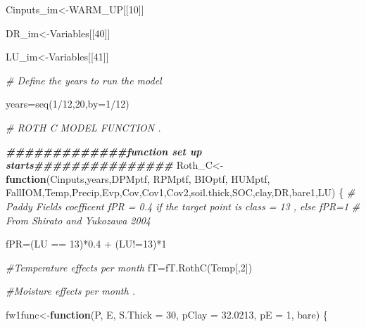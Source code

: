 \documentclass[
  10pt,
  b5paper,
]{book}
\newenvironment{Shaded}{\begin{snugshade}}{\end{snugshade}}
\newcommand{\AttributeTok}[1]{\textcolor[rgb]{0.77,0.63,0.00}{#1}}
\newcommand{\CommentTok}[1]{\textcolor[rgb]{0.56,0.35,0.01}{\textit{#1}}}
\newcommand{\ControlFlowTok}[1]{\textcolor[rgb]{0.13,0.29,0.53}{\textbf{#1}}}
\newcommand{\DecValTok}[1]{\textcolor[rgb]{0.00,0.00,0.81}{#1}}
\newcommand{\DocumentationTok}[1]{\textcolor[rgb]{0.56,0.35,0.01}{\textbf{\textit{#1}}}}
\newcommand{\FloatTok}[1]{\textcolor[rgb]{0.00,0.00,0.81}{#1}}
\newcommand{\FunctionTok}[1]{\textcolor[rgb]{0.00,0.00,0.00}{#1}}
\newcommand{\NormalTok}[1]{#1}
\newcommand{\OtherTok}[1]{\textcolor[rgb]{0.56,0.35,0.01}{#1}}
\newcommand{\SpecialCharTok}[1]{\textcolor[rgb]{0.00,0.00,0.00}{#1}}
\begin{document}
\begin{Shaded}
\begin{Highlighting}[]
\NormalTok{Cinputs\_im}\OtherTok{\textless{}{-}}\NormalTok{WARM\_UP[[}\DecValTok{10}\NormalTok{]]}

\NormalTok{DR\_im}\OtherTok{\textless{}{-}}\NormalTok{Variables[[}\DecValTok{40}\NormalTok{]]}

\NormalTok{LU\_im}\OtherTok{\textless{}{-}}\NormalTok{Variables[[}\DecValTok{41}\NormalTok{]]}

\CommentTok{\# Define the years to run the model}

\NormalTok{years}\OtherTok{=}\FunctionTok{seq}\NormalTok{(}\DecValTok{1}\SpecialCharTok{/}\DecValTok{12}\NormalTok{,}\DecValTok{20}\NormalTok{,}\AttributeTok{by=}\DecValTok{1}\SpecialCharTok{/}\DecValTok{12}\NormalTok{)}

\CommentTok{\# ROTH C MODEL FUNCTION . }

\DocumentationTok{\#\#\#\#\#\#\#\#\#\#\#\#\#function set up starts\#\#\#\#\#\#\#\#\#\#\#\#\#\#\#}
\NormalTok{Roth\_C}\OtherTok{\textless{}{-}}\ControlFlowTok{function}\NormalTok{(Cinputs,years,DPMptf, RPMptf, BIOptf, HUMptf, FallIOM,Temp,Precip,Evp,Cov,Cov1,Cov2,soil.thick,SOC,clay,DR,bare1,LU)}
\NormalTok{\{}
\CommentTok{\# Paddy Fields coefficent fPR = 0.4 if the target point is class = 13 , else fPR=1}
\CommentTok{\# From Shirato and Yukozawa 2004}

\NormalTok{fPR}\OtherTok{=}\NormalTok{(LU }\SpecialCharTok{==} \DecValTok{13}\NormalTok{)}\SpecialCharTok{*}\FloatTok{0.4} \SpecialCharTok{+}\NormalTok{ (LU}\SpecialCharTok{!=}\DecValTok{13}\NormalTok{)}\SpecialCharTok{*}\DecValTok{1}

\CommentTok{\#Temperature effects per month}
\NormalTok{fT}\OtherTok{=}\FunctionTok{fT.RothC}\NormalTok{(Temp[,}\DecValTok{2}\NormalTok{]) }

\CommentTok{\#Moisture effects per month . }

\NormalTok{fw1func}\OtherTok{\textless{}{-}}\ControlFlowTok{function}\NormalTok{(P, E, }\AttributeTok{S.Thick =} \DecValTok{30}\NormalTok{, }\AttributeTok{pClay =} \FloatTok{32.0213}\NormalTok{, }\AttributeTok{pE =} \DecValTok{1}\NormalTok{, bare) }
\NormalTok{\{}
   

\end{Highlighting}
\end{Shaded}
\end{document}
